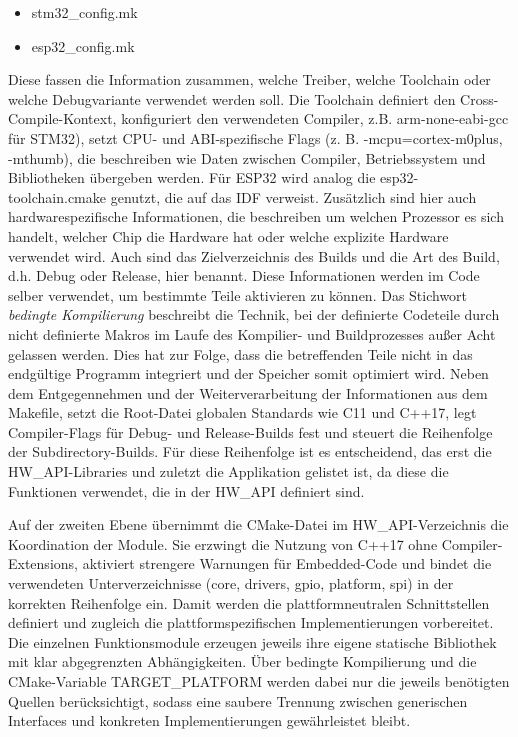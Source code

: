 \begin{itemize}
	\item stm32\_config.mk
	\item esp32\_config.mk
\end{itemize}

Diese fassen die Information zusammen, welche Treiber, welche Toolchain oder welche Debugvariante verwendet werden soll.
Die Toolchain definiert den Cross-Compile-Kontext, konfiguriert den verwendeten Compiler, z.B. arm-none-eabi-gcc für STM32), setzt CPU- und ABI-spezifische Flags (z. B. -mcpu=cortex-m0plus, -mthumb), die beschreiben wie Daten zwischen Compiler, Betriebssystem und Bibliotheken übergeben werden.
Für ESP32 wird analog die esp32-toolchain.cmake genutzt, die auf das IDF verweist.
Zusätzlich sind hier auch hardwarespezifische Informationen, die beschreiben um welchen Prozessor es sich handelt, welcher Chip die Hardware hat oder welche explizite Hardware verwendet wird.
Auch sind das Zielverzeichnis des Builds und die Art des Build, d.h. Debug oder Release, hier benannt.
Diese Informationen werden im Code selber verwendet, um bestimmte Teile aktivieren zu können.
Das Stichwort \textit{bedingte Kompilierung} beschreibt die Technik, bei der definierte Codeteile durch nicht definierte Makros im Laufe des Kompilier- und Buildprozesses außer Acht gelassen werden. 
Dies hat zur Folge, dass die betreffenden Teile nicht in das endgültige Programm integriert und der Speicher somit optimiert wird.
Neben dem Entgegennehmen und der Weiterverarbeitung der Informationen aus dem Makefile, setzt die Root-Datei globalen Standards wie C11 und C++17, legt Compiler-Flags für Debug- und Release-Builds fest und steuert die Reihenfolge der Subdirectory-Builds.
Für diese Reihenfolge ist es entscheidend, das erst die HW\_API-Libraries und zuletzt die Applikation gelistet ist, da diese die Funktionen verwendet, die in der HW\_API definiert sind.

Auf der zweiten Ebene übernimmt die CMake-Datei im HW\_API-Verzeichnis die Koordination der Module. 
Sie erzwingt die Nutzung von C++17 ohne Compiler-Extensions, aktiviert strengere Warnungen für Embedded-Code und bindet die verwendeten Unterverzeichnisse (core, drivers, gpio, platform, spi) in der korrekten Reihenfolge ein.
Damit werden die plattformneutralen Schnittstellen definiert und zugleich die plattformspezifischen Implementierungen vorbereitet. 
Die einzelnen Funktionsmodule erzeugen jeweils ihre eigene statische Bibliothek mit klar abgegrenzten Abhängigkeiten. 
Über bedingte Kompilierung und die CMake-Variable TARGET\_PLATFORM werden dabei nur die jeweils benötigten Quellen berücksichtigt, sodass eine saubere Trennung zwischen generischen Interfaces und konkreten Implementierungen gewährleistet bleibt.

